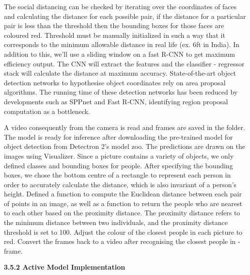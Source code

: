 \documentclass[12pt]{article}
\begin{document}
\begin{justify}
 
\end{justify}
\begin{justify}
The social distancing can be checked by iterating over the coordinates of faces and calculating the distance for each possible pair, if the distance for a particular pair is less than the threshold then the bounding boxes for those faces are coloured red. Threshold must be manually initialized in such a way that it corresponds to the minimum allowable distance in real life (ex. 6ft in India). In addition to this, we’ll use a sliding window on a fast R-CNN to get maximum efficiency output. The CNN will extract the features and the classifier - regressor stack will calculate the distance at maximum accuracy. State-of-the-art object detection networks to hypothesise object coordinates rely on area proposal algorithms. The running time of these detection networks has been reduced by developments such as SPPnet and Fast R-CNN, identifying region proposal computation as a bottleneck.
\end{justify}
\begin{justify}
 
\end{justify}
\begin{justify}
A video consequently from the camera is read and frames are saved in the folder. The model is ready for inference after downloading the pre-trained model for object detection from Detectron 2's model zoo. The predictions are drawn on the images using Visualizer. Since a picture contains a variety of objects, we only defined classes and bounding boxes for people. After specifying the bounding boxes, we chose the bottom centre of a rectangle to represent each person in order to accurately calculate the distance, which is also invariant of a person's height. Defined a function to compute the Euclidean distance between each pair of points in an image, as well as a function to return the people who are nearest to each other based on the proximity distance. The proximity distance refers to the minimum distance between two individuals, and the proximity distance threshold is set to 100. Adjust the colour of the closest people in each picture to red. Convert the frames back to a video after recognising the closest people in - frame. 
\end{justify}
\setlength{\parskip}{12.0pt}
\begin{justify}
{\fontsize{14pt}{16.8pt}\selectfont \textbf{3.5.2 Active Model Implementation}}
\end{justify}
\end{document}
